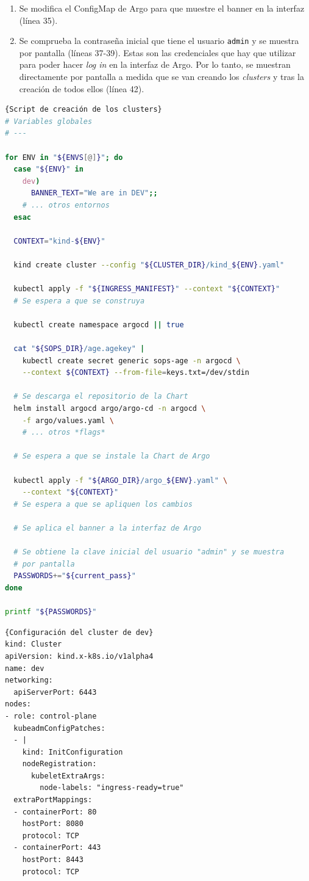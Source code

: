 \begin{enumerate}
  \item Se modifica el ConfigMap de Argo para que muestre el banner en la interfaz (línea 35).
  \item Se comprueba la contraseña inicial que tiene el usuario \texttt{admin} y se muestra por pantalla (líneas 37-39). Estas son las credenciales que hay que utilizar para poder hacer \textit{log in} en la interfaz de Argo. Por lo tanto, se muestran directamente por pantalla a medida que se van creando los \textit{clusters} y tras la creación de todos ellos (línea 42).

\end{enumerate}

\begin{lstlisting}[language=bash,label=lst:create-clusters]{Script de creación de los clusters}
# Variables globales
# ---

for ENV in "${ENVS[@]}"; do
  case "${ENV}" in
    dev)
      BANNER_TEXT="We are in DEV";;
    # ... otros entornos
  esac

  CONTEXT="kind-${ENV}"

  kind create cluster --config "${CLUSTER_DIR}/kind_${ENV}.yaml"

  kubectl apply -f "${INGRESS_MANIFEST}" --context "${CONTEXT}"
  # Se espera a que se construya

  kubectl create namespace argocd || true

  cat "${SOPS_DIR}/age.agekey" |
    kubectl create secret generic sops-age -n argocd \
    --context ${CONTEXT} --from-file=keys.txt=/dev/stdin

  # Se descarga el repositorio de la Chart
  helm install argocd argo/argo-cd -n argocd \
    -f argo/values.yaml \
    # ... otros *flags*

  # Se espera a que se instale la Chart de Argo

  kubectl apply -f "${ARGO_DIR}/argo_${ENV}.yaml" \
    --context "${CONTEXT}"
  # Se espera a que se apliquen los cambios

  # Se aplica el banner a la interfaz de Argo

  # Se obtiene la clave inicial del usuario "admin" y se muestra
  # por pantalla
  PASSWORDS+="${current_pass}"
done

printf "${PASSWORDS}"
\end{lstlisting}

\begin{lstlisting}[language=helm,label=lst:conf-cluster]{Configuración del cluster de dev}
kind: Cluster
apiVersion: kind.x-k8s.io/v1alpha4
name: dev
networking:
  apiServerPort: 6443
nodes:
- role: control-plane
  kubeadmConfigPatches:
  - |
    kind: InitConfiguration
    nodeRegistration:
      kubeletExtraArgs:
        node-labels: "ingress-ready=true"
  extraPortMappings:
  - containerPort: 80
    hostPort: 8080
    protocol: TCP
  - containerPort: 443
    hostPort: 8443
    protocol: TCP
\end{lstlisting}

